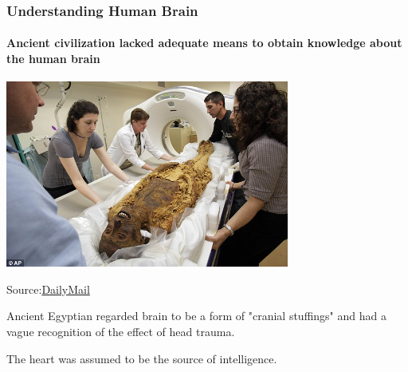 \documentclass{beamer}
\begin{document}
\begin{frame}
  \frametitle{Understanding Human Brain}
  \framesubtitle{Ancient civilization lacked adequate means to obtain knowledge about the human brain}
  \centering
  \includegraphics[width=0.7\textwidth]{EgyptianMummy.jpg}

  Source:\href{https://www.dailymail.co.uk/sciencetech/article-1195045/Ancient-Egyptians-unwrapped-CT-scans-reveal-secrets-beneath-bandages-2-000-year-old-mummies.html}{DailyMail}

  Ancient Egyptian regarded brain to be a form of "cranial stuffings" and had a vague recognition of the effect of head trauma.

  The heart was assumed to be the source of intelligence.
\end{frame}
\end{document}
